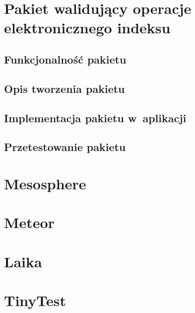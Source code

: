 \documentclass[brudnopis]{xmgr}
\begin{document}
\chapter{Pakiet walidujący operacje elektronicznego indeksu}

\section{Funkcjonalność pakietu}
\section{Opis tworzenia pakietu}
\cite{Packages}
\cite{MeteorDocs}
\cite{DiscoverMeteor2013}
\section{Implementacja pakietu w~aplikacji}
\section{Przetestowanie pakietu}
\cite{TinyTest}

\summary

\appendix
\chapter{Mesosphere}


\chapter{Meteor}


\chapter{Laika}


\chapter{TinyTest}







\listoftables

\listoffigures

\oswiadczenie
\end{document}
